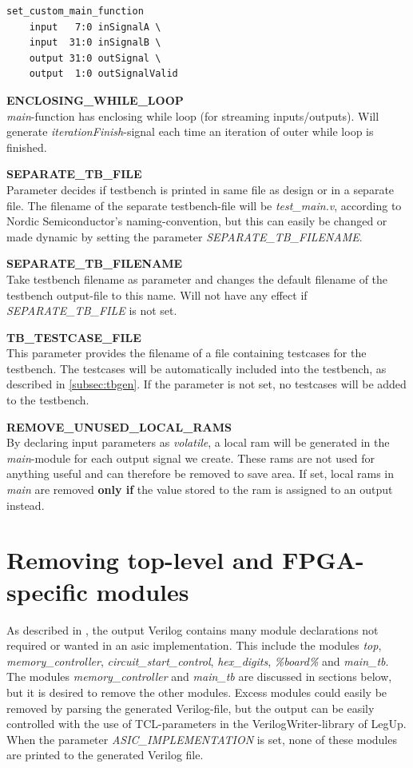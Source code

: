 \begin{description}
\begin{verbatim}
set_custom_main_function 
    input   7:0 inSignalA \
    input  31:0 inSignalB \
    output 31:0 outSignal \
    output  1:0 outSignalValid
\end{verbatim}
\item{\textbf{ENCLOSING\_WHILE\_LOOP}} \hfill \\
\textit{main}-function has enclosing while loop (for streaming inputs/outputs). Will generate \textit{iterationFinish}-signal each time an iteration of outer while loop is finished.
\item{\textbf{SEPARATE\_TB\_FILE}} \hfill \\
Parameter decides if testbench is printed in same file as design or in a separate file. The filename of the separate testbench-file will be \textit{test\_main.v}, according to Nordic Semiconductor's naming-convention, but this can easily be changed or made dynamic by setting the parameter \textit{SEPARATE\_TB\_FILENAME}.
\item{\textbf{SEPARATE\_TB\_FILENAME}} \hfill \\
Take testbench filename as parameter and changes the default filename of the testbench output-file to this name. Will not have any effect if \textit{SEPARATE\_TB\_FILE} is not set.
\item{\textbf{TB\_TESTCASE\_FILE}} \hfill \\
This parameter provides the filename of a file containing testcases for the testbench. The testcases will be automatically included into the testbench, as described in \cref{subsec:tbgen}. If the parameter is not set, no testcases will be added to the testbench.
\item{\textbf{REMOVE\_UNUSED\_LOCAL\_RAMS}} \hfill \\
By declaring input parameters as \textit{volatile}, a local \gls{ram} will be generated in the \textit{main}-module for each output signal we create. These \gls{ram}s are not used for anything useful and can therefore be removed to save area. If set, local \gls{ram}s in \textit{main} are removed \textbf{only if} the value stored to the \gls{ram} is assigned to an output instead.
\end{description}

\section{\label{sec:removingmodules}Removing top-level and FPGA-specific modules}
As described in \cite{holm2015pro}, the output Verilog contains many module declarations not required or wanted in an \gls{asic} implementation. This include the modules \textit{top}, \textit{memory\_controller}, \textit{circuit\_start\_control}, \textit{hex\_digits}, \textit{\%board\%} and \textit{main\_tb}. The modules \textit{memory\_controller} and \textit{main\_tb} are discussed in sections below, but it is desired to remove the other modules. Excess modules could easily be removed by parsing the generated Verilog-file, but the output can be easily controlled with the use of TCL-parameters in the VerilogWriter-library of LegUp. When the parameter \textit{ASIC\_IMPLEMENTATION} is set, none of these modules are printed to the generated Verilog file.

